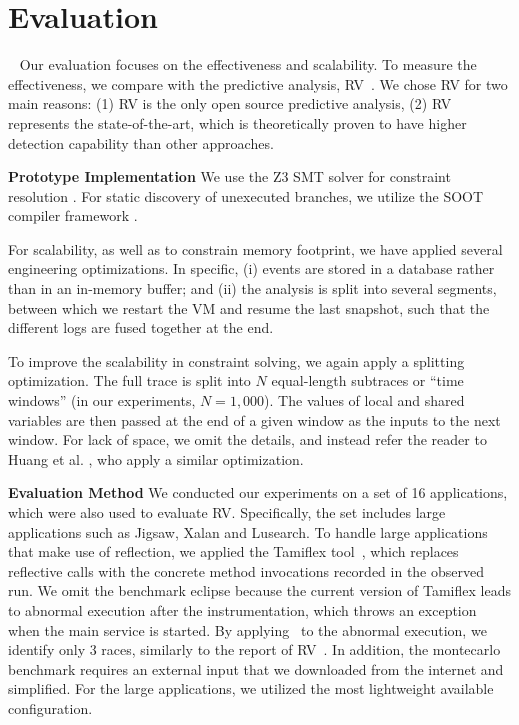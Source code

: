 \section{Evaluation}~\label{sec:eval}
Our evaluation focuses on the effectiveness  and scalability.
To measure the effectiveness, we compare with the predictive analysis, 
{\sf RV}~\cite{pldi14}. We chose RV for two main reasons: (1) {\sf RV} is the 
only open source predictive analysis, (2) {\sf RV} represents the 
state-of-the-art, which is theoretically proven to have higher detection 
capability than other approaches. 

{\bf Prototype Implementation}  We use the Z3 SMT solver for constraint 
resolution \cite{MouraB08}. For static discovery of unexecuted 
branches, we utilize the SOOT compiler framework \cite{Vallee-RaiCGHLS99}.

For scalability, as well as to constrain memory footprint, we have 
applied several engineering optimizations. In specific, (i) events are 
stored in a database rather than in an in-memory buffer; and (ii) the 
analysis is split into several segments, between which we restart 
the VM and resume the last snapshot, such that the different logs 
are fused together at the end. 


To improve the scalability in constraint solving, we again apply 
a splitting optimization. The full trace is split into $N$ equal-length 
subtraces or ``time windows'' (in our experiments, $N=1,000$). The values 
of local and shared variables are then passed at the end of a 
given window as the inputs to the next window. For lack of space, we 
omit the details, and instead refer the reader to 
Huang et al. \cite{pldi14}, who apply a similar optimization.


{\bf Evaluation Method} We conducted our experiments on a set of 16 
applications, which were also used to evaluate {\sf RV}. Specifically, 
the set includes large applications such as {\sf Jigsaw}, 
{\sf Xalan} and {\sf Lusearch}. To handle large applications that make 
use of reflection, we applied the {\sf Tamiflex} tool~\cite{tamiflex}, which 
replaces reflective calls with the concrete method invocations recorded 
in the observed run.
We omit the benchmark {\sf eclipse} because the current version 
of {\sf Tamiflex}  leads to abnormal execution after the instrumentation, 
which throws an exception when the main service is started. 
By applying \tool\  to the abnormal execution, we identify only 3 races, 
similarly to the report of RV~\cite{pldi14}.
In addition, the {\sf montecarlo} benchmark requires an external input 
that we downloaded from the internet and simplified. For the large 
applications, we utilized the most lightweight available configuration.



